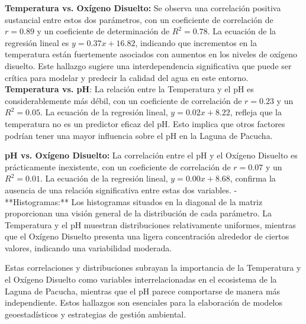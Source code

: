 \textbf{Temperatura vs. Oxígeno Disuelto:} Se observa una correlación positiva sustancial entre estos dos parámetros, con un coeficiente de correlación de \( r = 0.89 \) y un coeficiente de determinación de \( R^2 = 0.78 \). La ecuación de la regresión lineal es \( y = 0.37x + 16.82 \), indicando que incrementos en la temperatura están fuertemente asociados con aumentos en los niveles de oxígeno disuelto. Este hallazgo sugiere una interdependencia significativa que puede ser crítica para modelar y predecir la calidad del agua en este entorno.
\textbf{Temperatura vs. pH}: La relación entre la Temperatura y el pH es considerablemente más débil, con un coeficiente de correlación de \( r = 0.23 \) y un \( R^2 = 0.05 \). La ecuación de la regresión lineal, \( y = 0.02x + 8.22 \), refleja que la temperatura no es un predictor eficaz del pH. Esto implica que otros factores podrían tener una mayor influencia sobre el pH en la Laguna de Pacucha.

\textbf{pH vs. Oxígeno Disuelto:} La correlación entre el pH y el Oxígeno Disuelto es prácticamente inexistente, con un coeficiente de correlación de \( r = 0.07 \) y un \( R^2 = 0.01 \). La ecuación de la regresión lineal, \( y = 0.00x + 8.68 \), confirma la ausencia de una relación significativa entre estas dos variables.
- **Histogramas:** Los histogramas situados en la diagonal de la matriz proporcionan una visión general de la distribución de cada parámetro. La Temperatura y el pH muestran distribuciones relativamente uniformes, mientras que el Oxígeno Disuelto presenta una ligera concentración alrededor de ciertos valores, indicando una variabilidad moderada.

Estas correlaciones y distribuciones subrayan la importancia de la Temperatura y el Oxígeno Disuelto como variables interrelacionadas en el ecosistema de la Laguna de Pacucha, mientras que el pH parece comportarse de manera más independiente. Estos hallazgos son esenciales para la elaboración de modelos geoestadísticos y estrategias de gestión ambiental.



